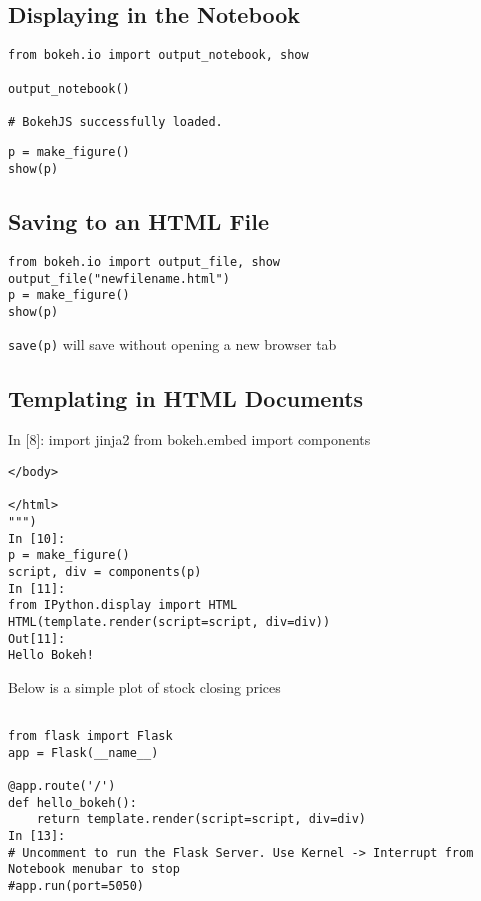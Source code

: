 \documentclass[a4paper,12pt]{article}
\begin{document}
\subsection{Displaying in the Notebook}

\begin{framed}
\begin{verbatim}
from bokeh.io import output_notebook, show

output_notebook()

# BokehJS successfully loaded.
\end{verbatim}
\end{framed}

\begin{framed}
\begin{verbatim}
p = make_figure()
show(p)
\end{verbatim}
\end{framed}
\subsection{Saving to an HTML File}
\begin{framed}
\begin{verbatim}
from bokeh.io import output_file, show
output_file("newfilename.html")
p = make_figure()
show(p)   
\end{verbatim}
\end{framed}
\texttt{save(p)} will save without opening a new browser tab
\newpage
\subsection{Templating in HTML Documents}
In [8]:
import jinja2
from bokeh.embed import components
\begin{framed}
\begin{verbatim}
</body>

</html>
""")
In [10]:
p = make_figure()
script, div = components(p)
In [11]:
from IPython.display import HTML
HTML(template.render(script=script, div=div))
Out[11]:
Hello Bokeh!
\end{verbatim}
\end{framed}
Below is a simple plot of stock closing prices

	
\begin{framed}
\begin{verbatim}

from flask import Flask
app = Flask(__name__)

@app.route('/')
def hello_bokeh():
    return template.render(script=script, div=div)
In [13]:
# Uncomment to run the Flask Server. Use Kernel -> Interrupt from Notebook menubar to stop 
#app.run(port=5050)
\end{verbatim}
\end{framed}
\end{document}
